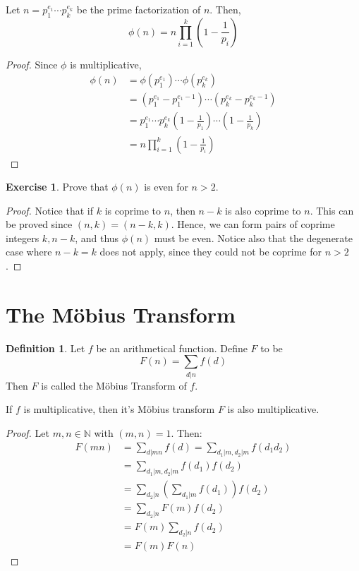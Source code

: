 \documentclass[12pt,letterpaper]{book}
\theoremstyle{definition}
\newtheorem{definition}{Definition} %
\newtheorem*{exercise}{Exercise}
\newcommand{\N}{\mathbb{N}}
\begin{document}
\begin{theorem}
  Let $n = p_1^{e_1} \cdots p_k ^{e_k}$ be the prime factorization of $n$. Then,
  \[\phi(n) = n \prod_{i=1}^k \left (1 - \frac{1}{p_i}\right)\]
\end{theorem}
\begin{proof}
  Since $\phi$ is multiplicative,
  \begin{align*}
    \phi(n) &= \phi(p_1^{e_1}) \cdots \phi(p_k^{e_k}) \\
            &= (p_1^{e_1} - p_1^{e_1-1}) \cdots (p_k^{e_k} - p_k ^{e_k-1}) \\         &= p_1^{e_1} \cdots p_k^{e_k} \left(1-\frac{1}{p_1} \right)\cdots \left (1-\frac{1}{p_k} \right) \\
            &= n \prod_{i=1}^k \left( 1-\frac{1}{p_i} \right)
  \end{align*}
\end{proof}

\begin{exercise}
  Prove that $\phi(n)$ is even for $n > 2$. 
\end{exercise}
\begin{proof}
  Notice that if $k$ is coprime to $n$, then $n-k$ is also coprime to $n$. This can be proved since $(n,k) = (n-k,k)$. Hence, we can form pairs of coprime integers $k,n-k$, and thus $\phi(n)$ must be even. Notice also that the degenerate case where $n-k = k$ does not apply, since they could not be coprime for $n > 2$.
\end{proof}

\section{The M\"{o}bius Transform}

\begin{definition}
  Let $f$ be an arithmetical function. Define $F$ to be
  \[F(n) = \sum_{d|n} f(d)\]
  Then $F$ is called the M\"{o}bius Transform of $f$.
\end{definition}

\begin{theorem}
  If $f$ is multiplicative, then it's M\"{o}bius transform $F$ is also multiplicative.
\end{theorem}
\begin{proof}
  Let $m,n \in \N$ with $(m,n) = 1$. Then:
  \begin{align*}
    F(mn) &= \sum_{d|mn} f(d) = \sum_{d_1|m,d_2|m} f(d_1d_2) \\
          &= \sum_{d_1|m,d_2|m} f(d_1) f(d_2) \\
          &= \sum_{d_2|n} \left( \sum_{d_1|m}f(d_1) \right) f(d_2) \\
          &= \sum_{d_2|n} F(m) f(d_2) \\
          &= F(m) \sum_{d_2|n} f(d_2) \\
          &= F(m) F(n)
  \end{align*}
\end{proof}
\end{document}
